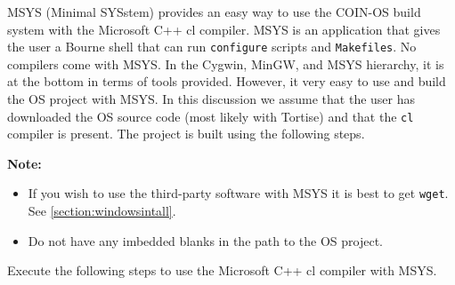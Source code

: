 \documentclass[11pt]{article}
\renewcommand{\_}{{\char"5F}}
\renewcommand{\{}{{\char"7B}}
\renewcommand{\}}{{\char"7D}}
\renewcommand{\^}{{\char"0D}}
\renewcommand{\'}{{\char"0D}}
\begin{document}
MSYS (Minimal SYSstem) provides an easy way to use the COIN-OS build system with the Microsoft C++ cl compiler.  MSYS is an application that gives the user a Bourne shell that can run {\tt configure}  scripts and {\tt Makefiles}.  No compilers come with MSYS. In the Cygwin, MinGW, and MSYS hierarchy, it is at the bottom in terms of tools provided. However, it very easy to use and build the OS project with MSYS.    In this discussion we assume that the user has downloaded the OS source code (most likely  with Tortise) and that the {\tt cl} compiler is present.  The project is built using the following steps. 

\vskip 8pt

{\bf Note:}

\begin{itemize}

\item If you wish to use the third-party software with MSYS it is best to get {\tt wget}. See \ref{section:windowsintall}. 
 
 \item Do not have any imbedded blanks in the path to the OS project.
 \end{itemize}



Execute the following steps to use the Microsoft C++ cl compiler with MSYS.
\end{document}
